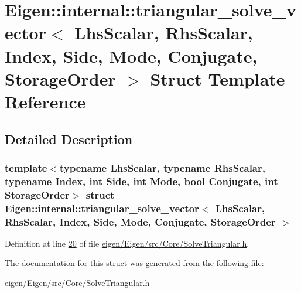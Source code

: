 \hypertarget{struct_eigen_1_1internal_1_1triangular__solve__vector}{}\section{Eigen\+:\+:internal\+:\+:triangular\+\_\+solve\+\_\+vector$<$ Lhs\+Scalar, Rhs\+Scalar, Index, Side, Mode, Conjugate, Storage\+Order $>$ Struct Template Reference}
\label{struct_eigen_1_1internal_1_1triangular__solve__vector}


\subsection{Detailed Description}
\subsubsection*{template$<$typename Lhs\+Scalar, typename Rhs\+Scalar, typename Index, int Side, int Mode, bool Conjugate, int Storage\+Order$>$\newline
struct Eigen\+::internal\+::triangular\+\_\+solve\+\_\+vector$<$ Lhs\+Scalar, Rhs\+Scalar, Index, Side, Mode, Conjugate, Storage\+Order $>$}



Definition at line \hyperlink{eigen_2_eigen_2src_2_core_2_solve_triangular_8h_source_l00020}{20} of file \hyperlink{eigen_2_eigen_2src_2_core_2_solve_triangular_8h_source}{eigen/\+Eigen/src/\+Core/\+Solve\+Triangular.\+h}.



The documentation for this struct was generated from the following file\+:\begin{DoxyCompactItemize}
\item 
eigen/\+Eigen/src/\+Core/\+Solve\+Triangular.\+h\end{DoxyCompactItemize}
